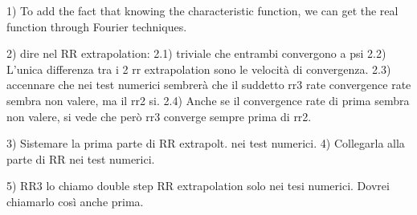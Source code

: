


1) To add the fact that knowing the characteristic function, we can get the real function through Fourier techniques. 

2) dire nel RR extrapolation:
2.1) triviale che entrambi convergono a psi
2.2) L'unica differenza tra i 2 rr extrapolation sono le velocità di convergenza.
2.3) accennare che nei test numerici sembrerà che il suddetto rr3 rate convergence rate sembra non valere, ma il rr2 si.
2.4) Anche se il convergence rate di prima sembra non valere, si vede che però rr3 converge sempre prima di rr2.

3) Sistemare la prima parte di RR extrapolt. nei test numerici.
4) Collegarla alla parte di RR nei test numerici.

5) RR3 lo chiamo double step RR extrapolation solo nei tesi numerici. Dovrei chiamarlo così anche prima.
